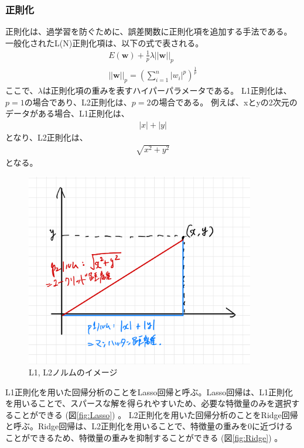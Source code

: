 \documentclass{ltjsarticle}
\begin{document}
\subsubsection{正則化}
正則化は、過学習を防ぐために、誤差関数に正則化項を追加する手法である。
一般化されたL(N)正則化項は、以下の式で表される。
\begin{align}
  E(\mathbf{w}) + \frac{1}{p} \lambda ||\mathbf{w}||_p \\
  ||\mathbf{w}||_p = \left( \sum_{i=1}^{n}|w_i|^p \right)^{\frac{1}{p}}
\end{align}
ここで、$\lambda$は正則化項の重みを表すハイパーパラメータである。 
L1正則化は、$p=1$の場合であり、L2正則化は、$p=2$の場合である。
例えば、xとyの2次元のデータがある場合、L1正則化は、
\begin{align}
  |x| + |y|
\end{align}
となり、L2正則化は、
\begin{align}
  \sqrt{x^2 + y^2}
\end{align}
となる。
\begin{figure}
  \centering
  \includegraphics[width=10cm]{./capture/L1L2.png}
  \caption{L1, L2ノルムのイメージ}
\end{figure}
L1正則化を用いた回帰分析のことをLasso回帰と呼ぶ。Lasso回帰は、L1正則化を用いることで、スパースな解を得られやすいため、必要な特徴量のみを選択することができる (図\ref{fig:Lasso}) 。
L2正則化を用いた回帰分析のことをRidge回帰と呼ぶ。Ridge回帰は、L2正則化を用いることで、特徴量の重みを0に近づけることができるため、特徴量の重みを抑制することができる (図\ref{fig:Ridge}) 。
\end{document}
